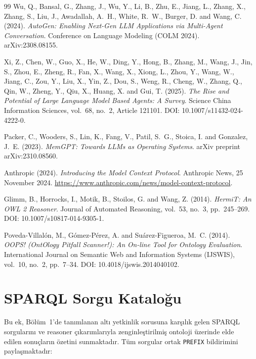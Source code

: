 \documentclass[10pt, a4paper, twocolumn]{article}
\begin{document}
\begin{thebibliography}{99}
Wu, Q., Bansal, G., Zhang, J., Wu, Y., Li, B., Zhu, E., Jiang, L., Zhang, X., Zhang, S., Liu, J., Awadallah, A.~H., White, R.~W., Burger, D. and Wang, C. (2024).
\textit{AutoGen: Enabling Next-Gen LLM Applications via Multi-Agent Conversation}.
Conference on Language Modeling (COLM 2024).
arXiv:2308.08155.

Xi, Z., Chen, W., Guo, X., He, W., Ding, Y., Hong, B., Zhang, M., Wang, J., Jin, S., Zhou, E., Zheng, R., Fan, X., Wang, X., Xiong, L., Zhou, Y., Wang, W., Jiang, C., Zou, Y., Liu, X., Yin, Z., Dou, S., Weng, R., Cheng, W., Zhang, Q., Qin, W., Zheng, Y., Qiu, X., Huang, X. and Gui, T. (2025).
\textit{The Rise and Potential of Large Language Model Based Agents: A Survey}.
Science China Information Sciences, vol.~68, no.~2, Article 121101.
DOI: 10.1007/s11432-024-4222-0.

Packer, C., Wooders, S., Lin, K., Fang, V., Patil, S.~G., Stoica, I. and Gonzalez, J.~E. (2023).
\textit{MemGPT: Towards LLMs as Operating Systems}.
arXiv preprint arXiv:2310.08560.

Anthropic (2024).
\textit{Introducing the Model Context Protocol}.
Anthropic News, 25 November 2024.
\url{https://www.anthropic.com/news/model-context-protocol}.

Glimm, B., Horrocks, I., Motik, B., Stoilos, G. and Wang, Z. (2014).
\textit{HermiT: An OWL 2 Reasoner}.
Journal of Automated Reasoning, vol.~53, no.~3, pp.~245--269.
DOI: 10.1007/s10817-014-9305-1.

Poveda-Villalón, M., Gómez-Pérez, A. and Suárez-Figueroa, M.~C. (2014).
\textit{OOPS! (OntOlogy Pitfall Scanner!): An On-line Tool for Ontology Evaluation}.
International Journal on Semantic Web and Information Systems (IJSWIS), vol.~10, no.~2, pp.~7--34.
DOI: 10.4018/ijswis.2014040102.

\end{thebibliography}

\clearpage
\appendix

\section{SPARQL Sorgu Kataloğu}
\label{app:sparql}

Bu ek, Bölüm~1'de tanımlanan altı yetkinlik sorusuna karşılık gelen SPARQL sorgularını ve reasoner çıkarımlarıyla zenginleştirilmiş ontoloji üzerinde elde edilen sonuçların özetini sunmaktadır. Tüm sorgular ortak \texttt{PREFIX} bildirimini paylaşmaktadır:
\end{document}

